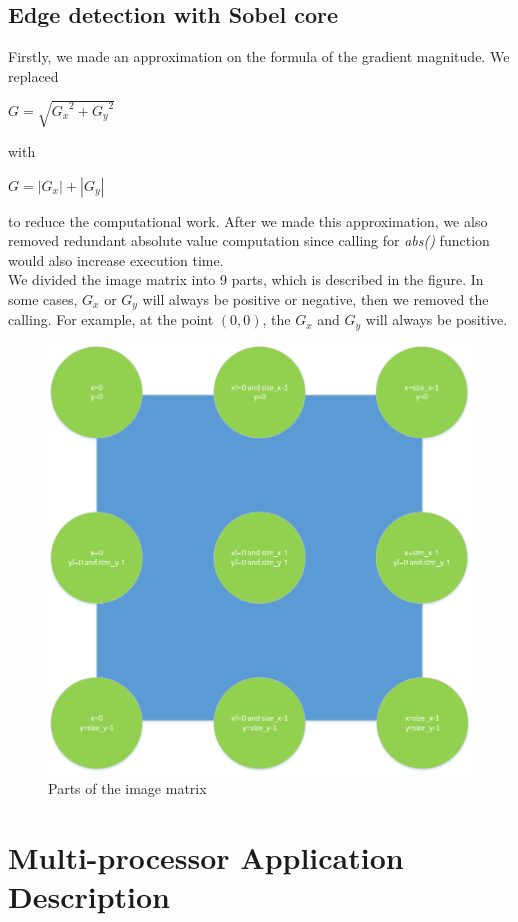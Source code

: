 \documentclass[conference]{IEEEtran}
\begin{document}
\subsection{Edge detection with Sobel core}
Firstly, we made an approximation on the formula of the gradient magnitude. We replaced
\begin{center}
	$G = \sqrt{{G_x}^2 + {G_y}^2}$
\end{center}
with
\begin{center}
	$G = |G_x| + |G_y|$
\end{center}
to reduce the computational work. After we made this approximation, we also removed redundant absolute value computation since calling for \emph{abs()} function would also increase execution time.\\
\indent
We divided the image matrix into 9 parts, which is described in the figure. In some cases, $G_x$ or $G_y$ will always be positive or negative, then we removed the calling. For example, at the point $(0,0)$, the $G_x$ and $G_y$ will always be positive.
\begin{figure}
	\centering
	\includegraphics[scale=0.3]{part.png}
	\caption{Parts of the image matrix}
	\label{fg:part}
\end{figure}
\section{Multi-processor Application Description}
\end{document}
